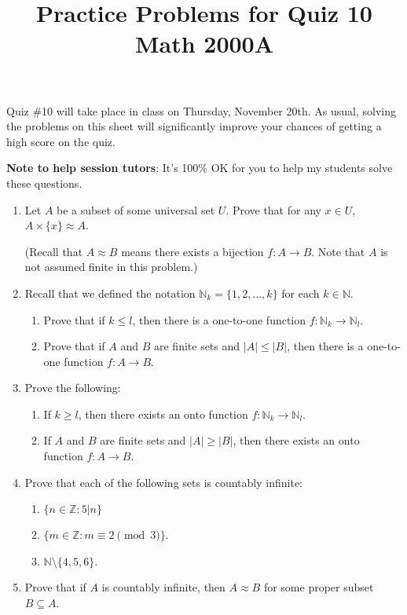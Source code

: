 \documentclass[letterpaper,12pt]{article}
\title{Practice Problems for Quiz 10\\Math 2000A}
\date{}
\newcommand{\N}{\mathbb{N}}
\newcommand{\Z}{\mathbb{Z}}
\newcommand{\modd}[3]{#1\equiv #2 \pmod{#3}}
\newcommand{\abs}[1]{\lvert #1\rvert}
\begin{document}
 \maketitle
\vspace{-0.5in}

Quiz \#10 will take place in class on Thursday, November 20th. 
As usual, solving the problems on this sheet will significantly improve your chances of getting a high score on the quiz.

{\bf Note to help session tutors}: It's 100\% OK for you to help my students solve these questions.
\begin{enumerate}
\item Let $A$ be a subset of some universal set $U$. Prove that for any $x\in U$, $A\times\{x\}\approx A$.

(Recall that $A\approx B$ means there exists a bijection $f:A\to B$. Note that $A$ is not assumed finite in this problem.)

\item Recall that we defined the notation $\N_k = \{1,2,\ldots, k\}$ for each $k\in\N$.
\begin{enumerate}
 \item Prove that if $k\leq l$, then there is a one-to-one function $f:\N_k\to\N_l$.
 \item Prove that if $A$ and $B$ are finite sets and $\abs{A}\leq \abs{B}$, then there is a one-to-one function $f:A\to B$.
\end{enumerate}
\item Prove the following:
\begin{enumerate}
 \item If $k\geq l$, then there exists an onto function $f:\N_k\to\N_l$.
 \item If $A$ and $B$ are finite sets and $\abs{A}\geq \abs{B}$, then there exists an onto function $f:A\to B$.
\end{enumerate}

\item Prove that each of the following sets is countably infinite:
\begin{enumerate}
 \item $\{n\in \Z : 5|n\}$
 \item $\{m\in \Z : \modd{m}{2}{3}\}$.
 \item $\N\setminus\{4,5,6\}$.
\end{enumerate}
\item Prove that if $A$ is countably infinite, then $A\approx B$ for some proper subset $B\subseteq A$. 


\end{enumerate}
\end{document}
